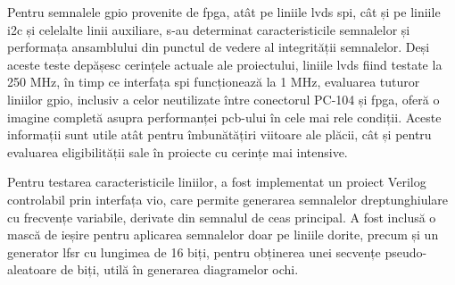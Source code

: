 \documentclass[12pt,a4paper]{report}
\begin{document}
Pentru semnalele \gls{gpio} provenite de \gls{fpga}, atât pe liniile \gls{lvds} \gls{spi}, cât și pe liniile \gls{i2c} și celelalte linii auxiliare, s-au determinat caracteristicile semnalelor și performața ansamblului din punctul de vedere al integrității semnalelor. Deși aceste teste depășesc cerințele actuale ale proiectului, liniile \gls{lvds} fiind testate la 250 MHz, în timp ce interfața \gls{spi} funcționează la 1 MHz, evaluarea tuturor liniilor \gls{gpio}, inclusiv a celor neutilizate între conectorul PC-104 și \gls{fpga}, oferă o imagine completă asupra performanței \gls{pcb}-ului în cele mai rele condiții. Aceste informații sunt utile atât pentru îmbunătățiri viitoare ale plăcii, cât și pentru evaluarea eligibilității sale în proiecte cu cerințe mai intensive.

Pentru testarea caracteristicile liniilor, a fost implementat un proiect Verilog controlabil prin interfața \gls{vio}, care permite generarea semnalelor dreptunghiulare cu frecvențe variabile, derivate din semnalul de ceas principal. A fost inclusă o mască de ieșire pentru aplicarea semnalelor doar pe liniile dorite, precum și un generator \gls{lfsr} cu lungimea de 16 biți, pentru obținerea unei secvențe pseudo-aleatoare de biți, utilă în generarea diagramelor ochi.
\end{document}
